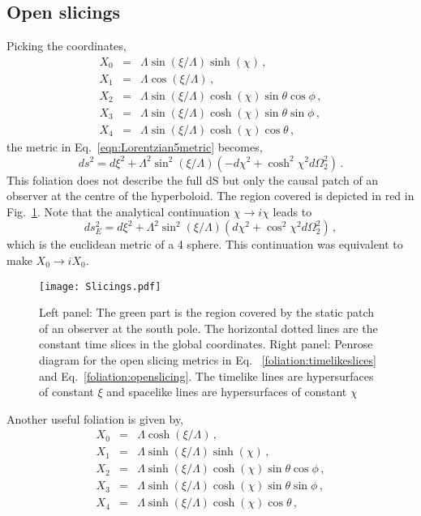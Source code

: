 \documentclass[a4paper,11pt]{article}
\numberwithin{equation}{section}
\begin{document}
\subsection*{Open slicings}
 Picking the coordinates,
\begin{eqnarray}
X_0&=&\Lambda \sin(\xi/\Lambda)\sinh(\chi)\,, \label{foliation:timelikeslices}\\
X_1&=&\Lambda\cos(\xi/\Lambda) \,, \nonumber\\
X_2&=&\Lambda \sin(\xi/\Lambda)\cosh(\chi)\sin\theta\cos\phi \,, \nonumber\\
X_3&=&\Lambda \sin(\xi/\Lambda)\cosh(\chi)\sin\theta\sin\phi \,, \nonumber\\
X_4&=&\Lambda \sin(\xi/\Lambda)\cosh(\chi)\cos\theta \,, \nonumber
\end{eqnarray}
the metric in Eq.~\eqref{eqn:Lorentzian5metric} becomes,
\begin{equation}
ds^2=d\xi^2+\Lambda^2\sin^2(\xi/\Lambda)(-d\chi^2+\cosh^2\chi^2 d\Omega_2^2)\,.
\end{equation}
This foliation does not describe the full dS but only the causal patch of an observer at the centre of the hyperboloid. The region covered is  depicted in red in Fig.~\ref{fig:deSitter_hyperbolic_slicing}. Note that  the analytical  continuation $\chi\to i \chi$ leads to
\begin{equation}
ds_E^2=d\xi^2+\Lambda^2\sin^2(\xi/\Lambda)(d\chi^2+\cos^2\chi^2 d\Omega_2^2) \,,
\label{metric:euclidean}
\end{equation}
which is the euclidean metric of a 4 sphere. This  continuation was equivalent to make $X_0\to i X_0$.
\begin{figure}[h!] 
\begin{center} 
\texttt{[image: Slicings.pdf]}
\caption{Left panel: The green part is the region covered by the static patch of an observer at the south pole. The horizontal dotted lines are the constant time slices in the global coordinates. Right panel:  Penrose diagram for the open slicing metrics in Eq.~ \eqref{foliation:timelikeslices} and Eq.~\eqref{foliation:openslicing}. The timelike lines are hypersurfaces of constant $\xi$ and spacelike lines are hypersurfaces of constant $\chi$ \label{fig:deSitter_hyperbolic_slicing}}
\end{center} 
\end{figure}
Another useful foliation is given by,
\begin{eqnarray}
X_0&=& \Lambda \cosh(\xi/\Lambda)\nonumber \,, \\\label{foliation:openslicing}
X_1&=&\Lambda \sinh(\xi/\Lambda)\sinh(\chi) \,, \\
X_2&=&\Lambda \sinh(\xi/\Lambda)\cosh(\chi)\sin\theta\cos\phi \,, \nonumber\\
X_3&=&\Lambda  \sinh(\xi/\Lambda)\cosh(\chi)\sin\theta\sin\phi \,, \nonumber\\
X_4&=&\Lambda  \sinh(\xi/\Lambda)\cosh(\chi)\cos\theta \,, \nonumber
\end{eqnarray}
\end{document}
